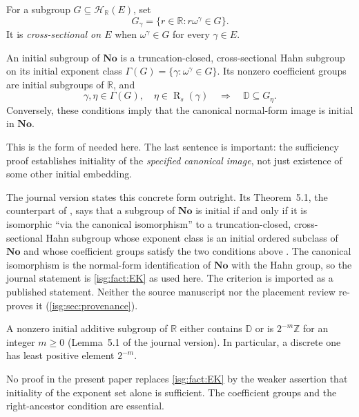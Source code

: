 \documentclass[11pt]{article}
\theoremstyle{definition}
\theoremstyle{remark}
\newcommand{\No}{\ensuremath{\mathbf{No}}}
\newcommand{\R}{\mathbb{R}}
\newcommand{\Z}{\mathbb{Z}}
\newcommand{\D}{\mathbb{D}}
\newcommand{\Rs}{\operatorname{R}_{s}}
\newcommand{\Hahn}[2]{\mathcal{H}_{#1}(#2)}
\begin{document}
For a subgroup $G\subseteq\Hahn{\R}{E}$, set
\[
 G_\gamma=\{r\in\R:r\omega^\gamma\in G\}.
\]
It is \emph{cross-sectional on $E$} when $\omega^\gamma\in G$ for
every $\gamma\in E$.

\begin{fact}\label{isg:fact:EK}
An initial subgroup of $\No$ is a truncation-closed, cross-sectional
Hahn subgroup on its initial exponent class
$\Gamma(G)=\{\gamma:\omega^\gamma\in G\}$. Its nonzero coefficient
groups are initial subgroups of $\R$, and
\begin{equation}\label{isg:eq:dyadic}
 \gamma,\eta\in\Gamma(G),\quad \eta\in\Rs(\gamma)
 \quad\Longrightarrow\quad \D\subseteq G_\eta.
\end{equation}
Conversely, these conditions imply that the canonical normal-form image
is initial in $\No$.
\end{fact}

This is the form of \cite[Theorem~1 and its proof]{EK} needed here.
The last sentence is important: the sufficiency proof establishes
initiality of the \emph{specified canonical image}, not just existence of
some other initial embedding.

The journal version states this concrete form outright. Its Theorem~5.1,
the counterpart of \cite[Theorem~1]{EK}, says that a subgroup of $\No$ is
initial if and only if it is isomorphic ``via the canonical isomorphism''
to a truncation-closed, cross-sectional Hahn subgroup whose exponent
class is an initial ordered subclass of $\No$ and whose coefficient
groups satisfy the two conditions above \cite{EKjournal}. The canonical
isomorphism is the normal-form identification of $\No$ with the Hahn
group, so the journal statement is \cref{isg:fact:EK} as used here.
The criterion is imported as a published statement. Neither the source
manuscript nor the placement review re-proves it
(\cref{isg:sec:provenance}).

\begin{fact}\label{isg:fact:real}
A nonzero initial additive subgroup of $\R$ either contains $\D$ or is
$2^{-m}\Z$ for an integer $m\ge0$ \cite[Lemma~3]{EK}
\textup{(}Lemma~5.1 of the journal version\textup{)}.
In particular, a discrete one has least positive element $2^{-m}$.
\end{fact}

No proof in the present paper replaces \cref{isg:fact:EK} by the weaker
assertion that initiality of the exponent set alone is sufficient. The
coefficient groups and the right-ancestor condition are essential.
\end{document}
